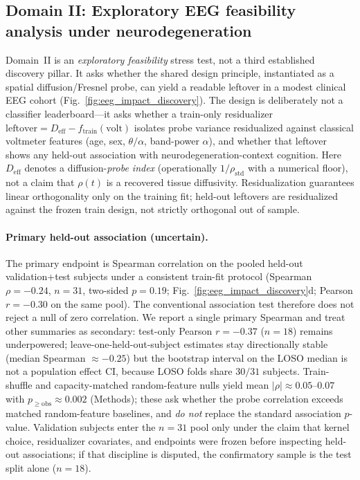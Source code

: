 \documentclass[twocolumn, 10pt]{article}
\begin{document}
\subsection*{Domain II: Exploratory EEG feasibility analysis under neurodegeneration}

Domain~II is an \emph{exploratory feasibility} stress test, not a third established discovery pillar. It asks whether the shared design principle, instantiated as a spatial diffusion/Fresnel probe, can yield a readable leftover in a modest clinical EEG cohort (Fig.~\ref{fig:eeg_impact_discovery}). The design is deliberately not a classifier leaderboard---it asks whether a train-only residualizer
\(\mathrm{leftover}=D_{\mathrm{eff}}-f_{\mathrm{train}}(\mathrm{volt})\)
isolates probe variance residualized against classical voltmeter features (age, sex, \(\theta/\alpha\), band-power \(\alpha\)), and whether that leftover shows any held-out association with neurodegeneration-context cognition\cite{timmers2022,sohrabpour2025}. Here \(D_{\mathrm{eff}}\) denotes a diffusion-\emph{probe index} (operationally \(1/\rho_{\mathrm{std}}\) with a numerical floor), not a claim that \(\rho(t)\) is a recovered tissue diffusivity. Residualization guarantees linear orthogonality only on the training fit; held-out leftovers are residualized against the frozen train design, not strictly orthogonal out of sample.

\paragraph{Primary held-out association (uncertain).}
The primary endpoint is Spearman correlation on the pooled held-out validation+test subjects under a consistent train-fit protocol (Spearman \(\rho=-0.24\), \(n=31\), two-sided \(p=0.19\); Fig.~\ref{fig:eeg_impact_discovery}d; Pearson \(r=-0.30\) on the same pool)\cite{jeong2004}. The conventional association test therefore does not reject a null of zero correlation. We report a single primary Spearman and treat other summaries as secondary: test-only Pearson \(r=-0.37\) (\(n=18\)) remains underpowered; leave-one-held-out-subject estimates stay directionally stable (median Spearman \(\approx-0.25\)) but the bootstrap interval on the LOSO median is not a population effect CI, because LOSO folds share \(30/31\) subjects. Train-shuffle and capacity-matched random-feature nulls yield mean \(|\rho|\approx0.05\)--\(0.07\) with \(p_{\ge\mathrm{obs}}\approx0.002\) (Methods); these ask whether the probe correlation exceeds matched random-feature baselines, and \emph{do not} replace the standard association \(p\)-value. Validation subjects enter the \(n=31\) pool only under the claim that kernel choice, residualizer covariates, and endpoints were frozen before inspecting held-out associations; if that discipline is disputed, the confirmatory sample is the test split alone (\(n=18\)).
\end{document}
